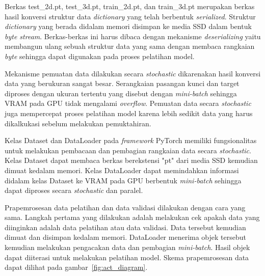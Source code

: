Berkas test\_2d.pt, test\_3d.pt, train\_2d.pt, dan train\_3d.pt merupakan berkas hasil konversi
struktur data \textit{dictionary} yang telah berbentuk \textit{serialized}.
Struktur \textit{dictionary} yang berada didalam memori disimpan ke media SSD dalam bentuk \textit{byte stream}.
Berkas-berkas ini harus dibaca dengan mekanisme \textit{deserializing} yaitu membangun ulang sebuah
struktur data yang sama dengan membaca rangkaian \textit{byte} sehingga dapat digunakan pada proses pelatihan model.

Mekanisme pemuatan data dilakukan secara \textit{stochastic} dikarenakan hasil konversi data yang
berukuran sangat besar. Serangkaian pasangan kunci dan target diproses dengan ukuran tertentu
yang disebut dengan \textit{mini-batch} sehingga
VRAM pada GPU tidak mengalami \textit{overflow}. Pemuatan data secara \textit{stochastic} juga
mempercepat proses pelatihan model karena lebih sedikit data yang harus dikalkukasi sebelum melakukan
pemuktahiran.

Kelas Dataset dan DataLoader pada \textit{framework} PyTorch memiliki fungsionalitas untuk melakukan
pembacaan dan pembagian rangkaian data secara \textit{stochastic}. Kelas Dataset dapat membaca berkas
berekstensi "pt" dari media SSD kemudian dimuat kedalam memori. Kelas DataLoader dapat memindahkan
informasi didalam kelas Dataset ke VRAM pada GPU berbentuk \textit{mini-batch} sehingga dapat diproses secara
\textit{stochastic} dan paralel.

Prapemrosesan data pelatihan dan data validasi dilakukan dengan cara yang sama. Langkah pertama
yang dilakukan adalah melakukan cek apakah data yang diinginkan adalah data pelatihan atau data
validasi. Data tersebut kemudian dimuat dan disimpan kedalam memori. DataLoader menerima objek
tersebut kemudian melakukan pengacakan data dan pembagian \textit{mini-batch}. Hasil objek dapat
diiterasi untuk melakukan pelatihan model. Skema prapemrosesan data dapat dilihat pada gambar~\ref{fig:act_diagram}.

